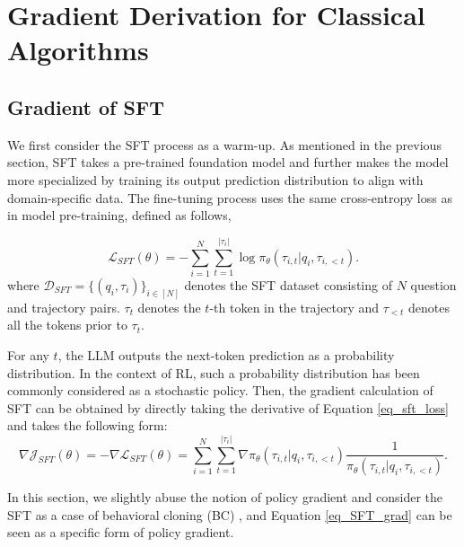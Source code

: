 \section{Gradient Derivation for Classical Algorithms} \label{sec:appdendix_grad_cal}
\subsection{Gradient of SFT}

We first consider the SFT process as a warm-up. 
As mentioned in the previous section, SFT takes a pre-trained foundation model and further makes the model more specialized by training its output prediction distribution to align with domain-specific data. 
The fine-tuning process uses the same cross-entropy loss as in model pre-training, defined as follows,

\begin{equation}\label{eq_sft_loss}
    \mathcal{L}_{SFT}(\theta) = - \sum_{i=1}^{N} \sum_{t = 1}^{|\tau_{i}|}\log \pi_{\theta} (\tau_{i,t} |q_i, \tau_{i, <t} ).
\end{equation}
where $\mathcal{D}_{SFT} = \{(q_i, \tau_i)\}_{i \in [N]}$ denotes the SFT dataset consisting of $N$ question and trajectory pairs. $\tau_t$ denotes the $t$-th token in the trajectory and $\tau_{<t}$ denotes all the tokens prior to $\tau_t$.

For any $t$, the LLM outputs the next-token prediction as a probability distribution. In the context of RL, such a probability distribution has been commonly considered as a stochastic policy. 
Then, the gradient calculation of SFT can be obtained by directly taking the derivative of Equation \eqref{eq_sft_loss} and takes the following form:
\begin{equation}\label{eq_SFT_grad}
    \nabla \mathcal{J}_{SFT}(\theta) = -\nabla \mathcal{L}_{SFT}(\theta) = 
     \sum_{i=1}^{N} \sum_{t = 1}^{|\tau_{i}|}
    \nabla \pi_\theta (\tau_{i,t} |q_i, \tau_{i, <t} ) \frac{1}{\pi_\theta (\tau_{i,t} |q_i, \tau_{i, <t} )}.
\end{equation}

In this section, we slightly abuse the notion of policy gradient and consider the SFT as a case of behavioral cloning (BC) \citep{torabi2018behavioral}, and Equation \eqref{eq_SFT_grad} can be seen as a specific form of policy gradient.

